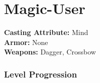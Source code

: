 \documentclass[18pt]{article}
\begin{document}
\section*{Magic-User}%
\begin{multicols}{3}
\begin{mercClassInfo}
\textbf{Casting Attribute:} Mind\\
\textbf{Armor:} None\\
\textbf{Weapons:} Dagger, Crossbow
\end{mercClassInfo}
\end{multicols}
\subsubsection*{Level Progression}
\vspace{-10pt}
\end{document}
